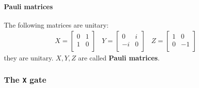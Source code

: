 \documentclass[a4paper,10pt]{article}
\begin{document}
\paragraph{Pauli matrices} The following matrices are unitary:
\begin{equation}
\begin{aligned}
X = \begin{bmatrix}
0 & 1 \\
1 & 0 \\
\end{bmatrix} \; \; \; 
Y = \begin{bmatrix}
0 & i \\
-i & 0 \\
\end{bmatrix} \; \; \;
Z = \begin{bmatrix}
1 & 0 \\
0 & -1 \\
\end{bmatrix}
\end{aligned}
\label{eq:pauliMatrices}
\end{equation}
they are unitary. $X, Y, Z$ are called \textbf{Pauli matrices}.

\subsubsection{The \texttt{X} gate}
\end{document}
